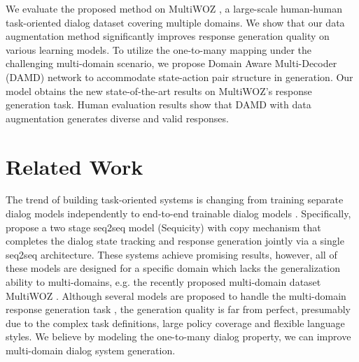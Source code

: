 \documentclass[letterpaper]{article} \usepackage{aaai20}  \usepackage{times}  \usepackage{helvet} \usepackage{courier}  \usepackage[hyphens]{url}  \usepackage{graphicx} \urlstyle{rm} \def\UrlFont{\rm}  \usepackage{graphicx}  \frenchspacing  \setlength{\pdfpagewidth}{8.5in}  \setlength{\pdfpageheight}{11in}  \usepackage{multirow}
\begin{document}
	We evaluate the proposed method on MultiWOZ \cite{budzianowski2018multiwoz}, a large-scale human-human task-oriented dialog dataset covering multiple domains. We show that our data augmentation method significantly improves response generation quality on various learning models. To utilize the one-to-many mapping under the challenging multi-domain scenario, we propose Domain Aware Multi-Decoder (DAMD) network to accommodate state-action pair structure in generation.  Our model obtains the new state-of-the-art results on MultiWOZ's response generation task. Human evaluation results show that DAMD with data augmentation generates diverse and valid responses. 
	


	
	
	\section{Related Work}
	The trend of building task-oriented systems is changing from training separate dialog models independently \cite{young2013pomdp,wen2015semantically,liu2016attention,mrkvsic2017neural}
	to end-to-end trainable dialog models \cite{zhao2017generative,wen2017network,eric2017key}. 
	Specifically, \citeauthor{lei2018sequicity}  propose a two stage seq2seq model (Sequicity) with copy mechanism \cite{gu2016incorporating} that completes the dialog state tracking and response generation jointly via a single seq2seq architecture. 
	These systems achieve promising results, however, all of these models are designed for a specific domain which lacks the generalization ability to multi-domains, e.g. the recently proposed multi-domain dataset MultiWOZ \cite{budzianowski2018multiwoz}. Although several models are proposed to handle the multi-domain response generation task \cite{zhao2019rethinking,mehri2019structured,chen2019semantically}, the generation quality is far from perfect, presumably due to the complex task definitions, large policy coverage and flexible language styles. We believe by modeling the one-to-many dialog property, we can improve multi-domain dialog system generation.
	
\end{document}
